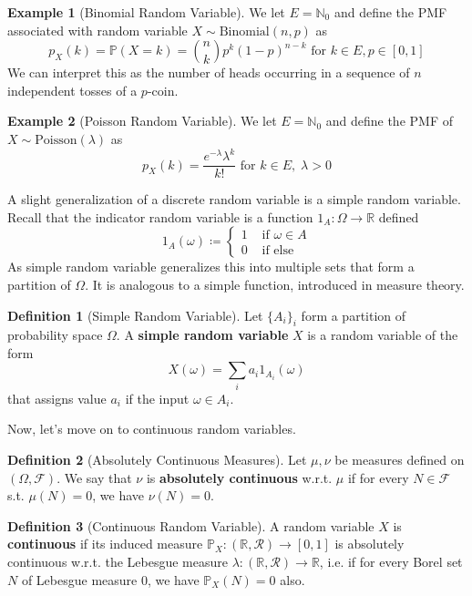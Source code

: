 \documentclass{article}
\theoremstyle{definition}
\newtheorem{example}{Example}[section]
\theoremstyle{remark}
\theoremstyle{definition}
\newtheorem{definition}{Definition}[section]
\begin{document}
\begin{example}[Binomial Random Variable]
We let $E = \mathbb{N}_0$ and define the PMF associated with random variable $X \sim \mathrm{Binomial}(n, p)$ as 
\[p_X (k) = \mathbb{P}(X = k) = \binom{n}{k} p^k (1 - p)^{n - k} \text{ for } k \in E, p \in [0, 1]\]
We can interpret this as the number of heads occurring in a sequence of $n$ independent tosses of a $p$-coin. 
\end{example}

\begin{example}[Poisson Random Variable]
We let $E = \mathbb{N}_0$ and define the PMF of $X \sim \mathrm{Poisson}(\lambda)$ as 
\[p_X (k) = \frac{e^{-\lambda} \lambda^k}{k!} \text{ for } k \in E, \; \lambda > 0\]
\end{example}

A slight generalization of a discrete random variable is a simple random variable. Recall that the indicator random variable is a function $1_A: \Omega \rightarrow \mathbb{R}$ defined 
\[1_A (\omega) \coloneqq \begin{cases} 1 & \text{ if } \omega \in A \\
0 & \text{ if else } \end{cases}\]
As simple random variable generalizes this into multiple sets that form a partition of $\Omega$. It is analogous to a simple function, introduced in measure theory. 

\begin{definition}[Simple Random Variable]
Let $\{A_i\}_i$ form a partition of probability space $\Omega$. A \textbf{simple random variable} $X$ is a random variable of the form 
\[X (\omega) = \sum_{i} a_i 1_{A_i} (\omega)\]
that assigns value $a_i$ if the input $\omega \in A_i$. 
\end{definition}

Now, let's move on to continuous random variables. 

\begin{definition}[Absolutely Continuous Measures]
Let $\mu, \nu$ be measures defined on $(\Omega, \mathcal{F})$. We say that $\nu$ is \textbf{absolutely continuous} w.r.t. $\mu$ if for every $N \in \mathcal{F}$ s.t. $\mu(N) = 0$, we have $\nu(N) = 0$. 
\end{definition}

\begin{definition}[Continuous Random Variable]
A random variable $X$ is \textbf{continuous} if its induced measure $\mathbb{P}_X: (\mathbb{R}, \mathcal{R}) \rightarrow [0, 1]$ is absolutely continuous w.r.t. the Lebesgue measure $\lambda: (\mathbb{R}, \mathcal{R}) \rightarrow \mathbb{R}$, i.e. if for every Borel set $N$ of Lebesgue measure $0$, we have $\mathbb{P}_X (N) = 0$ also. 
\end{definition}
\end{document}
